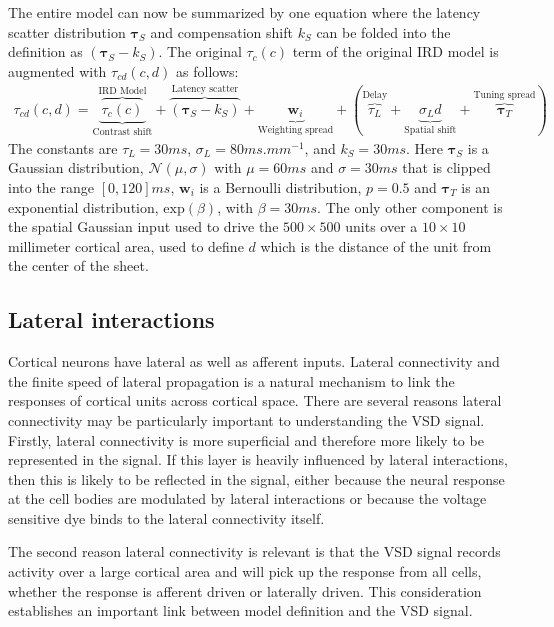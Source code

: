 \documentclass[phd,ianc,twoside]{infthesis}
\begin{document}
The entire model can now be summarized by one equation where the latency
scatter distribution $\pmb{\tau}_S$ and compensation shift $k_S$ can be
folded into the definition as $(\pmb{\tau}_S - k_S)$. The original
$\tau_c(c)$ term of the original IRD model is augmented with
$\tau_{cd}(c,d)$ as follows:
\begin{multline}
  \label{eq:IRD_latency_equation}
  \tau_{cd}(c,d) =
  \underbrace{\overbrace{\tau_c(c)}^{\text{IRD Model}}}_\text{Contrast shift} +
  \overbrace{(\pmb{\tau}_S - k_S)}^{\text{Latency scatter}}
  + \underbrace{\pmb{w}_i}_\text{Weighting spread} +
  (
  \overbrace{\tau_L}^{\text{Delay}}
  + \underbrace{\sigma_L d}_\text{Spatial shift}
  + \overbrace{\pmb{\tau}_T}^\text{Tuning spread}
  )
\end{multline}
The constants are $\tau_L=30\si{ms}$, $\sigma_L=80\si{ms.mm^{-1}}$, and
$k_S=30\si{ms}$. Here $\pmb{\tau}_S$ is a Gaussian
distribution, $\mathcal{N}(\mu,\sigma)$ with $\mu=60\si{ms}$ and
$\sigma=30\si{ms}$ that is clipped into the range $[0,120]\si{ms}$,
$\pmb{w}_i$ is a Bernoulli distribution, $p=0.5$ and $\pmb{\tau}_T$ is
an exponential distribution, $\mathrm{exp}(\beta)$, with $\beta=30
\si{ms}$. The only other component is the spatial Gaussian input used to
drive the $500\times500$ units over a $10\times10$ millimeter cortical
area, used to define $d$ which is the distance of the unit from the
center of the sheet.


\subsection{Lateral interactions}
\label{section:lateral_interactions}

Cortical neurons have lateral as well as afferent inputs. Lateral
connectivity and the finite speed of lateral propagation is a natural
mechanism to link the responses of cortical units across cortical space.
There are several reasons lateral connectivity may be particularly
important to understanding the VSD signal. Firstly, lateral connectivity
is more superficial and therefore more likely to be represented in the
signal. If this layer is heavily influenced by lateral interactions,
then this is likely to be reflected in the signal, either because the
neural response at the cell bodies are modulated by lateral interactions
or because the voltage sensitive dye binds to the lateral connectivity
itself.

The second reason lateral connectivity is relevant is that the VSD
signal records activity over a large cortical area and will pick up the
response from all cells, whether the response is afferent driven or
laterally driven. This consideration establishes an important link
between model definition and the VSD signal.
\end{document}

